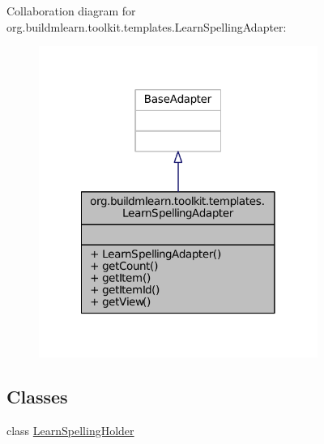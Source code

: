 Collaboration diagram for org.\-buildmlearn.\-toolkit.\-templates.\-Learn\-Spelling\-Adapter\-:
\nopagebreak
\begin{figure}[H]
\begin{center}
\leavevmode
\includegraphics[width=258pt]{d9/d6e/classorg_1_1buildmlearn_1_1toolkit_1_1templates_1_1LearnSpellingAdapter__coll__graph}
\end{center}
\end{figure}
\subsection*{Classes}
\begin{DoxyCompactItemize}
\item 
class \hyperlink{classorg_1_1buildmlearn_1_1toolkit_1_1templates_1_1LearnSpellingAdapter_1_1LearnSpellingHolder}{Learn\-Spelling\-Holder}
\end{DoxyCompactItemize}

